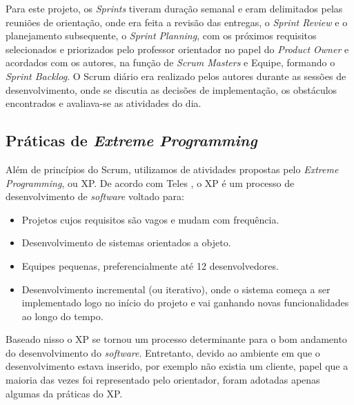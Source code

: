 Para este projeto, os \textit{Sprints} tiveram duração semanal e eram delimitados pelas reuniões de orientação, onde era feita a revisão das entregas, o \textit{Sprint Review} e o planejamento subsequente,  o \textit{Sprint Planning}, com os próximos requisitos selecionados e priorizados pelo professor orientador no papel do \textit{Product Owner} e acordados com os autores, na função de \textit{Scrum Masters} e Equipe, formando o \textit{Sprint Backlog}. O Scrum diário era realizado pelos autores durante as sessões de desenvolvimento, onde se discutia as decisões de implementação, os obstáculos encontrados e avaliava-se as atividades do dia.

\subsection{Práticas de \textit{Extreme Programming}}


Além de princípios do Scrum, utilizamos de atividades propostas pelo  \textit{Extreme Programming}, ou XP. De acordo com Teles \cite{book:xp}, o XP é um processo de desenvolvimento de \textit{software} voltado para:

\begin{itemize}
    \item Projetos cujos requisitos são vagos e mudam com frequência.
    \item Desenvolvimento de sistemas orientados a objeto.
    \item Equipes pequenas, preferencialmente até 12 desenvolvedores.
    \item Desenvolvimento incremental (ou iterativo), onde o sistema começa a ser implementado logo no início do projeto e vai ganhando novas funcionalidades ao longo do tempo.
\end{itemize}

Baseado nisso o XP se tornou um processo determinante para o bom andamento do desenvolvimento do \textit{software}. Entretanto, devido ao ambiente em que o desenvolvimento estava inserido, por exemplo não existia um cliente, papel que a maioria das vezes foi representado pelo orientador, foram adotadas apenas algumas da práticas do XP.

